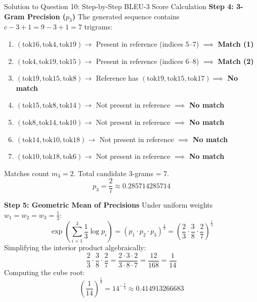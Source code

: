 \documentclass[11pt,a4paper]{article}
\begin{document}
\begin{solutionbox}{Solution to Question 10: Step-by-Step BLEU-3 Score Calculation}
\medskip
\noindent
\textbf{Step 4: 3-Gram Precision ($p_3$)}
The generated sequence contains $c - 3 + 1 = 9 - 3 + 1 = 7$ trigrams:
\begin{enumerate}[leftmargin=1.5em]
    \item $(\text{tok16}, \text{tok4}, \text{tok19}) \longrightarrow$ Present in reference (indices 5--7) $\implies$ \textcolor{accentgreen}{\textbf{Match (1)}}
    \item $(\text{tok4}, \text{tok19}, \text{tok15}) \longrightarrow$ Present in reference (indices 6--8) $\implies$ \textcolor{accentgreen}{\textbf{Match (2)}}
    \item $(\text{tok19}, \text{tok15}, \text{tok8}) \longrightarrow$ Reference has $(\text{tok19}, \text{tok15}, \text{tok17}) \implies$ \textcolor{accentred}{\textbf{No match}}
    \item $(\text{tok15}, \text{tok8}, \text{tok14}) \longrightarrow$ Not present in reference $\implies$ \textcolor{accentred}{\textbf{No match}}
    \item $(\text{tok8}, \text{tok14}, \text{tok10}) \longrightarrow$ Not present in reference $\implies$ \textcolor{accentred}{\textbf{No match}}
    \item $(\text{tok14}, \text{tok10}, \text{tok18}) \longrightarrow$ Not present in reference $\implies$ \textcolor{accentred}{\textbf{No match}}
    \item $(\text{tok10}, \text{tok18}, \text{tok6}) \longrightarrow$ Not present in reference $\implies$ \textcolor{accentred}{\textbf{No match}}
\end{enumerate}
Matches count $m_3 = 2$. Total candidate 3-grams = 7.
\begin{equation*}
    p_3 = \frac{2}{7} \approx \mathbf{0.285714285714}
\end{equation*}

\medskip
\noindent
\textbf{Step 5: Geometric Mean of Precisions}
Under uniform weights $w_1 = w_2 = w_3 = \frac{1}{3}$:
\begin{equation*}
    \exp\left( \sum_{i=1}^3 \frac{1}{3} \log p_i \right) = \left( p_1 \cdot p_2 \cdot p_3 \right)^{\frac{1}{3}} = \left( \frac{2}{3} \cdot \frac{3}{8} \cdot \frac{2}{7} \right)^{\frac{1}{3}}
\end{equation*}
Simplifying the interior product algebraically:
\begin{equation*}
    \frac{2}{3} \cdot \frac{3}{8} \cdot \frac{2}{7} = \frac{2 \cdot 3 \cdot 2}{3 \cdot 8 \cdot 7} = \frac{12}{168} = \frac{1}{14}
\end{equation*}
Computing the cube root:
\begin{equation*}
    \left( \frac{1}{14} \right)^{\frac{1}{3}} = 14^{-\frac{1}{3}} \approx \mathbf{0.414913266683}
\end{equation*}


\end{solutionbox}
\end{document}

